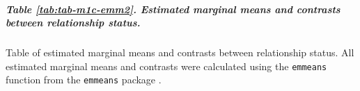 \documentclass[
  bookmarksnumbered]{article}
\begin{document}
\begin{table}[H]
\centering
\caption{\label{tab:tab-m1c-emm1}Estimated marginal means and contrasts between participants' gender}
\centering
{}
\end{table}

\subparagraph{Table \ref{tab:tab-m1c-emm2}. Estimated marginal means and contrasts between relationship status.}\label{table-reftabtab-m1c-emm2.-estimated-marginal-means-and-contrasts-between-relationship-status.}

Table of estimated marginal means and contrasts between relationship status. All estimated marginal means and contrasts were calculated using the \texttt{emmeans} function from the \texttt{emmeans} package \autocite{emmeanscit}.
\end{document}
